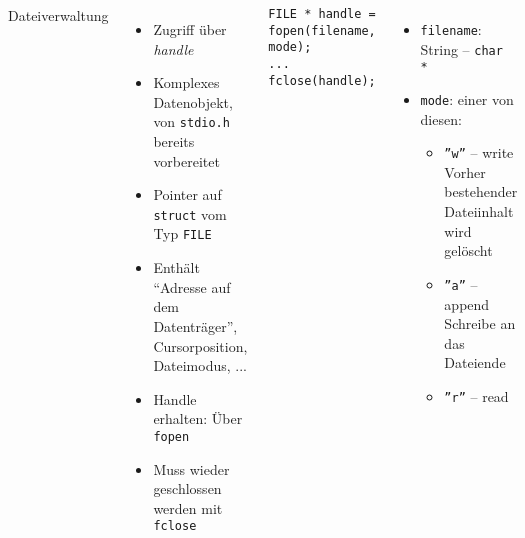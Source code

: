 \begin{frame}[fragile]
%
\begin{columns}[T]
\begin{Large}
Dateiverwaltung
\vspace{10pt}
\end{Large}
%
\begin{itemize}
\item Zugriff über \emph{handle}
	\item Komplexes Datenobjekt, von \texttt{stdio.h} bereits vorbereitet
	\item Pointer auf \texttt{struct} vom Typ \texttt{FILE}
	\item Enthält \enquote{Adresse auf dem Datenträger}, Cursorposition, Dateimodus, ...
\item Handle erhalten: Über \texttt{fopen}
\item Muss wieder geschlossen werden mit \texttt{fclose}
\end{itemize}
%
\begin{codebox}
\begin{verbatim}
FILE * handle = fopen(filename, mode);
...
fclose(handle);
\end{verbatim}
\end{codebox}
%
\begin{itemize}
\item \texttt{filename}: String -- \texttt{char *}
\item \texttt{mode}: einer von diesen:
	\begin{itemize}
	\item \texttt{''w''} -- write\newline
		Vorher bestehender Dateiinhalt wird gelöscht
	\item \texttt{''a''} -- append\newline
		Schreibe an das Dateiende
	\item \texttt{''r''} -- read
	\end{itemize}
\end{itemize}
%
\end{columns}
%
\end{frame}


